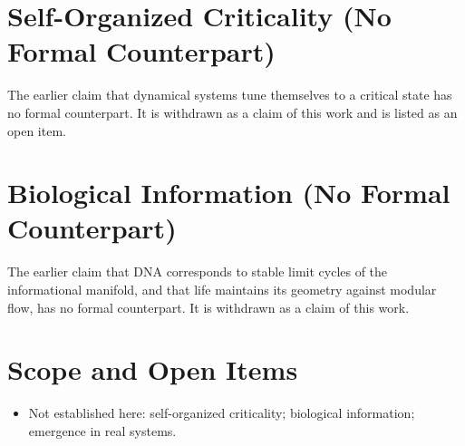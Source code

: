 \documentclass[11pt, a4paper]{article}
\begin{document}
\section{Self-Organized Criticality (No Formal Counterpart)}
The earlier claim that dynamical systems tune themselves to a critical state has no formal counterpart. It is withdrawn as a claim of this work and is listed as an open item.

\section{Biological Information (No Formal Counterpart)}
The earlier claim that DNA corresponds to stable limit cycles of the informational manifold, and that life maintains its geometry against modular flow, has no formal counterpart. It is withdrawn as a claim of this work.

\section{Scope and Open Items}
\begin{itemize}
  \item Not established here: self-organized criticality; biological information; emergence in real systems.
\end{itemize}
\end{document}
